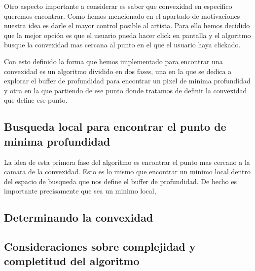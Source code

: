 Otro aspecto importante a considerar es saber que convexidad en especifico queremos encontrar. Como hemos mencionado en el apartado de motivaciones nuestra idea es darle el mayor control posible al artista. Para ello hemos decidido que la mejor opción es que el usuario pueda hacer click en pantalla y el algoritmo busque la convexidad mas cercana al punto en el que el usuario haya clickado.
 
Con esto definido la forma que hemos implementado para encontrar una convexidad es un algoritmo dividido en dos fases, una en la que se dedica a explorar el buffer de profundidad para encontrar un pixel de minima profundidad y otra en la que partiendo de ese punto donde tratamos de definir la convexidad que define ese punto.

\subsection{Busqueda local para encontrar el punto de minima profundidad}

La idea de esta primera fase del algoritmo es encontrar el punto mas cercano a la camara de la convexidad. Esto es lo mismo que encontrar un minimo local dentro del espacio de busqueda que nos define el buffer de profundidad. De hecho es importante precisamente que sea un minimo local, 

\subsection{Determinando la convexidad}

\subsection{Consideraciones sobre complejidad y completitud del algoritmo}

